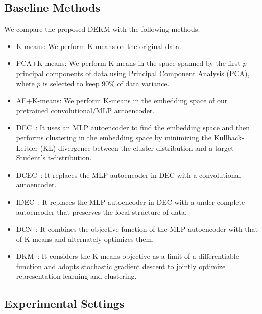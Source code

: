 \subsection{Baseline Methods}
We compare the proposed DEKM with the following methods:
\begin{itemize}
	\item K-means: We perform K-means on the original data.
	\item PCA+K-means: We perform K-means in the space spanned by the first $p$ principal components of data using Principal Component Analysis (PCA), where $p$ is selected to keep  90\% of data variance. 
	\item AE+K-means: We perform K-means in the embedding space of our pretrained convolutional/MLP autoencoder.
	\item DEC~\cite{DEC_xie2016unsupervised}: It uses an MLP autoencoder to find the embedding space and then performs clustering in the embedding space by minimizing the Kullback-Leibler (KL) divergence between the cluster distribution and a target Student’s t-distribution. 
	\item DCEC~\cite{DCEC_guo2017deep}: It replaces the MLP autoencoder in DEC with a convolutional autoencoder.
	\item IDEC~\cite{IDEC_guo2017improved}: It replaces the MLP autoencoder in DEC with a under-complete autoencoder that preserves the local structure of data.
	\item DCN~\cite{DCN_yang2017towards}: It combines the objective function of the MLP autoencoder with that of K-means and alternately optimizes them.
	\item DKM~\cite{fard2020deep}: It considers the K-means objective as a limit of a differentiable function and adopts stochastic gradient descent to jointly optimize representation learning and clustering.
\end{itemize} 

\subsection{Experimental Settings}

